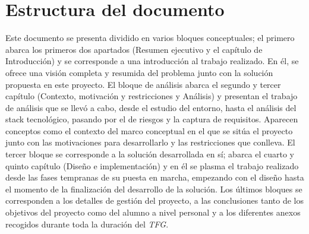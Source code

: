 \section{Estructura del documento} \label{introduccion.estructura}
	
Este documento se presenta dividido en varios bloques conceptuales; el primero abarca los primeros dos apartados (Resumen ejecutivo y el capítulo de Introducción) y se corresponde a una introducción al trabajo realizado. En él, se ofrece una visión completa y resumida del problema junto con la solución propuesta en este proyecto. El bloque de análisis abarca el segundo y tercer capítulo (Contexto, motivación y restricciones y Análisis) y presentan el trabajo de análisis que se llevó a cabo, desde el estudio del entorno, hasta el análisis del stack tecnológico, pasando por el de riesgos y la captura de requisitos. Aparecen conceptos como el contexto del marco conceptual en el que se sitúa el proyecto junto con las motivaciones para desarrollarlo y las restricciones que conlleva. El tercer bloque se corresponde a la solución desarrollada en sí; abarca el cuarto y quinto capítulo (Diseño e implementación) y en él se plasma el trabajo realizado desde las fases tempranas de su puesta en marcha, empezando con el diseño hasta el momento de la finalización del desarrollo de la solución.  Los últimos bloques se corresponden a los detalles de gestión del proyecto, a las conclusiones tanto de los objetivos del proyecto como del alumno a nivel personal y a los diferentes anexos recogidos durante toda la duración del \textit{TFG}.
